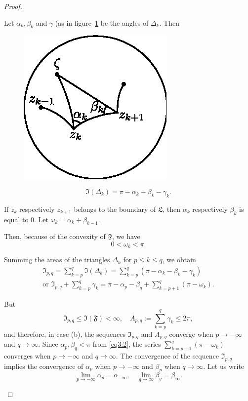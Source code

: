 \begin{proof}
\begin{enumerate}
Let \pageoriginale $\alpha_k, \beta_k$ and $\gamma$ 
(as in figure~\ref{chap1:fig5} be the angles of $\Delta_k$. Then

\begin{figure}[H]
\centering
\includegraphics{vol29-fig/fig29-5.eps}
\smallskip
\caption{}
\label{chap1:fig5}
\end{figure}

$$
\mathfrak{I} (\Delta_k) = \pi - \alpha_k - \beta_k -\gamma_k.
$$

If $z_k$ respectively $z_{k+1}$ belongs to the boundary of
$\mathfrak{L}$, then $\alpha_k$ respectively $\beta_k$ is equal 
to 0. Let $\omega_k =\alpha_k + \beta_{k-1}$.

Then, because of the convexity of $\mathfrak{F}$, we have 
\begin{equation*}
0 < \omega_k < \pi. \tag{2}\label{eq3:2}
\end{equation*}

Summing the areas of the triangles $\Delta_k$ for $p \leq k \leq q$,
we obtain 
\begin{gather*}
\mathfrak{I}_{p,q} = \sum^q_{k=p} \mathfrak{I} (\Delta_k) =
\sum^q_{k=p} (\pi - \alpha_k - \beta_k - \gamma_k)\\
\text{or } \mathfrak{I}_{p,q} + \sum^q_{k=p} \gamma_k = \pi - \alpha_p
- \beta_q + \sum^q_{k=p+1} (\pi - \omega_k). \tag{3}\label{eq3:3}
\end{gather*}

But
\begin{equation*}
\mathfrak{I}_{p,q} \leq \mathfrak{I} (\mathfrak{F}) < \infty, \quad
A_{p,q} := \sum^q_{k=p} \gamma_k \leq 2\pi, \tag{4}\label{eq3:4}
\end{equation*}
and therefore, in case (b), the sequences $\mathfrak{I}_{p,q}$ and
$A_{p,q}$ converge when $p \to -\infty$ and $q\to \infty$. Since
$\alpha_p, \beta_q <\pi$ from \eqref{eq3:2}, the series
$\sum\limits^q_{k=p+1}(\pi-\omega_k)$ converges when $p\to -\infty$ and $q\to
\infty$. The convergence of the sequence $\mathfrak{I}_{p,q}$ implies
the convergence of $\alpha_p$ when $p\to -\infty$ and $\beta_p$ when
$q \to \infty$. Let us write
\begin{equation*}
\lim_{p\to -\infty} \alpha_p = \alpha_{-\infty}, \quad
\lim_{q\to\infty} \beta_q = \beta_{\infty}. \tag{5}\label{eq3:5}
\end{equation*}


\end{enumerate}
\end{proof}
